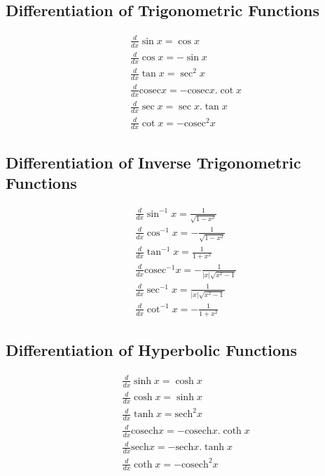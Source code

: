 \subsection{Differentiation of Trigonometric Functions}
\vspace{-3mm}
\begin{align*}
&\frac{d}{dx}\sin x = \cos x \\[5pt]
&\frac{d}{dx} \cos x = -\sin x \\[5pt]
&\frac{d}{dx} \tan x = \sec^{2} x \\[5pt]
&\frac{d}{dx} \mathrm{cosec} x = -\mathrm{cosec}x . \cot x \\[5pt]
&\frac{d}{dx}\sec x = \sec x. \tan x \\[5pt]
&\frac{d}{dx}\cot x = - \mathrm{cosec} ^2 x 
\end{align*}

\subsection{Differentiation of Inverse Trigonometric Functions}
\vspace{-3mm}
\begin{align*}
&\frac{d}{dx}\sin^{-1} x = \frac{1}{\sqrt{1-x^2}} \\[5pt]
&\frac{d}{dx} \cos^{-1} x = -\frac{1}{\sqrt{1-x^2}} \\[5pt]
&\frac{d}{dx} \tan^{-1} x = \frac{1}{1+x^2} \\[5pt]
&\frac{d}{dx} \mathrm{cosec}^{-1} x = -\frac{1}{|x|\sqrt{x^2 - 1}}\\[5pt]
&\frac{d}{dx}\sec^{-1} x = \frac{1}{|x|\sqrt{x^2-1}} \\[5pt]
&\frac{d}{dx}\cot^{-1} x = -\frac{1}{1+x^2} 
\end{align*}

\vspace{-7mm}

\subsection{Differentiation of Hyperbolic Functions}
\vspace{-3mm}
\begin{align*}
&\frac{d}{dx}\sinh x = \cosh x \\[5pt]
&\frac{d}{dx} \cosh x = \sinh x \\[5pt]
&\frac{d}{dx} \tanh x = \mathrm{sech} ^{2} x \\[5pt]
&\frac{d}{dx} \mathrm{cosech} x = -\mathrm{cosech}x . \coth x \\[5pt]
&\frac{d}{dx}\mathrm{sech} x = -\mathrm{sech} x. \tanh x \\[5pt]
&\frac{d}{dx}\coth x = - \mathrm{cosech} ^2 x 
\end{align*}

